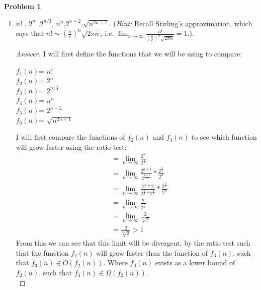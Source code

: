 \documentclass[11pt]{article}
\theoremstyle{definition}
\theoremstyle{definition}
\newtheorem{required}{Problem}
\theoremstyle{definition}
\begin{document}
\begin{required}
\begin{enumerate}[label=(\alph*)]
\subsection{Problem 13\ref{2b}}
        \item \label{2b} $n!$ , \qquad $2^n$ ,\qquad  $2^{n/3}$, \qquad  $n^n$,\qquad $2^{n-2}$,\qquad  $\sqrt{n^{2n+1}}$. (\emph{Hint:} Recall \href{https://en.wikipedia.org/wiki/Stirling\%27s_approximation}{Stirling's approximation}, which says that $n! \sim \left(\frac{n}{e}\right)^n \sqrt{2 \pi n}$, i.e. $\lim_{n \to \infty} \frac{n!}{\left(\frac{n}{e}\right)^n \sqrt{2 \pi n}} = 1$.).
\begin{proof}[Answer]
I will first define the functions that we will be using to compare: \\
\begin{center}
$f_1(n)$= $n!$ \\
$f_2(n)$= $2^n$\\
$f_3(n)$= $2^{n/3}$\\
$f_4(n)$= $n^n$\\
$f_5(n)$= $2^{n-2}$\\
$f_6(n)$= $\sqrt{n^{2n+1}}$\\
\end{center}
I will first compare the functions of $f_2(n)$ and $f_3(n)$ to see which function will grow faster using the ratio test: \\
\begin{align*}
&= \lim_{n \to \infty} \frac{2^{n}}{2^{\frac{n}{3}}} \\
&= \lim_{n \to \infty} \frac{2^{n + 1}}{2^{\frac{n+1}{3}}} * \frac{2^{\frac{n}{3}}}{2^{n}} \\
&= \lim_{n \to \infty} \frac{2^{n} * 2} {2^{\frac{n}{3}} * 2^{\frac{1}{3}}} * \frac{2^{\frac{n}{3}}}{2^{n}} \\
&= \lim_{n \to \infty} \frac{2}{2^{\frac{1}{3}}} \\
&= \lim_{n \to \infty} \frac{2}{\sqrt[3]2} \\
&= \frac{2}{\sqrt[3]2} > 1
\end{align*} 
From this we can see that this limit will be divergent, by the ratio test such that the function $f_2(n)$ will grow faster than the function of $f_3(n)$, such that $f_3(n) \in O(f_2(n))$. Where $f_3(n)$ exists as a lower bound of $f_2(n)$, such that $f_3(n) \in \Omega(f_2(n))$. \\


\end{proof}
\end{enumerate}
\end{required}
\end{document}
